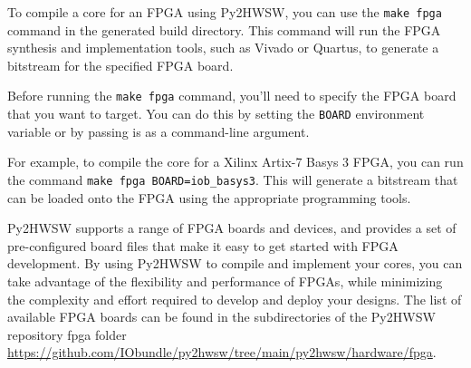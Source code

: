%

To compile a core for an FPGA using Py2HWSW, you can use the \texttt{make fpga} command in the generated build directory.
This command will run the FPGA synthesis and implementation tools, such as Vivado or Quartus, to generate a bitstream for the specified FPGA board.

Before running the \texttt{make fpga} command, you'll need to specify the FPGA board that you want to target. You can do this by setting the \texttt{BOARD} environment variable or by passing is as a command-line argument.

For example, to compile the core for a Xilinx Artix-7 Basys 3 FPGA, you can run the command \texttt{make fpga BOARD=iob_basys3}. This will generate a bitstream that can be loaded onto the FPGA using the appropriate programming tools.

Py2HWSW supports a range of FPGA boards and devices, and provides a set of pre-configured board files that make it easy to get started with FPGA development. By using Py2HWSW to compile and implement your cores, you can take advantage of the flexibility and performance of FPGAs, while minimizing the complexity and effort required to develop and deploy your designs.
The list of available FPGA boards can be found in the subdirectories of the Py2HWSW repository fpga folder \url{https://github.com/IObundle/py2hwsw/tree/main/py2hwsw/hardware/fpga}.
